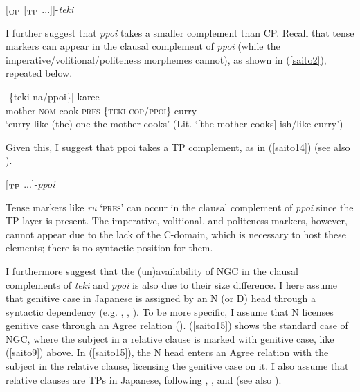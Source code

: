 \documentclass[output=paper]{langscibook}
\begin{document}
\begin{exe}
\ex \label{saito12}
[$_{\textnormal{CP}}$ [$_{\textnormal{TP}}$ ...]\hspace{0.5mm}]-\emph{teki}
\end{exe}

I further suggest that \emph{ppoi} takes a smaller complement than CP. Recall that tense markers can appear in the clausal complement of \emph{ppoi} (while the imperative/volitional/politeness morphemes cannot), as shown in (\ref{saito2}), repeated below. 

\begin{exe}
\ex \label{saito13}
\gll [[$_{\textnormal{S}}$ {okaasan-ga}   {tuku-ru}]-\{{teki-na/ppoi}\}] {karee}\\
{} mother-\textsc{nom} cook-\textsc{pres}-\{\textsc{teki-cop/ppoi}\} curry\\ 
\glt ‘curry like (the) one the mother cooks’ (Lit. ‘[the mother cooks]-ish/like curry’)
\end{exe}

Given this, I suggest that ppoi takes a TP complement, as in (\ref{saito14}) (see also \citealt{Yamada2014}).

\begin{exe}
\ex \label{saito14}
[$_{\textnormal{TP}}$ ...]-\emph{ppoi}
\end{exe}

Tense markers like \emph{ru} ‘\textsc{pres}’ can occur in the clausal complement of \emph{ppoi} since  the TP-layer is present. The imperative, volitional, and politeness markers, however, cannot appear due to the lack of the C-domain, which is necessary to host these elements; there is no syntactic position for them.

I furthermore suggest that the (un)availability of NGC in the clausal complements of \emph{teki} and \emph{ppoi} is also due to their size difference. I here assume that genitive case in Japanese is assigned by an N (or D) head through a syntactic dependency (e.g. \citealt{Bedell1972}, \citealt{miyagawa1993}, \citealt{miyagawa2011}). To be more specific, I assume that N licenses genitive case through an Agree relation (\citealt{miyagawa2011}). (\ref{saito15}) shows the standard case of NGC, where the subject in a relative clause is marked with genitive case, like (\ref{saito9}) above. In (\ref{saito15}), the N head enters an Agree relation with the subject in the relative clause, licensing the genitive case on it. I also assume that relative clauses are TPs in Japanese, following \citet{murasugi1991}, \citet{Taguchi2008}, and \citet{ParkYoo2017} (see also \citealt{Saito1985}).
\end{document}
